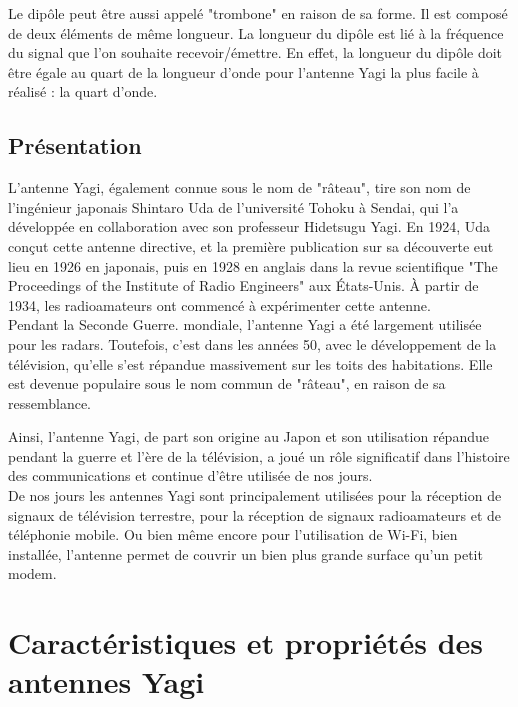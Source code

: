 \documentclass[12pt, a4paper]{article}
\begin{document}
Le dipôle peut être aussi appelé "trombone" en raison de sa
forme. Il est composé de deux éléments de même longueur. 
La longueur du dipôle est lié à la fréquence du signal
que l'on souhaite recevoir/émettre. En effet, la longueur
du dipôle doit être égale au quart de la longueur d'onde 
pour l'antenne Yagi la plus facile à réalisé : la quart d'onde.



\subsection{Présentation}

L'antenne Yagi, également connue sous le nom de 
"râteau", tire son nom de l'ingénieur japonais 
Shintaro Uda de l'université Tohoku à Sendai, qui 
l'a développée en collaboration avec son professeur 
Hidetsugu Yagi. En 1924, Uda conçut cette antenne 
directive, et la première publication sur sa découverte 
eut lieu en 1926 en japonais, puis en 1928 en anglais 
dans la revue scientifique "The Proceedings of the 
Institute of Radio Engineers" aux États-Unis. 
À partir de 1934, les radioamateurs ont commencé à
expérimenter cette antenne.\\

Pendant la Seconde Guerre. mondiale, l'antenne 
Yagi a été largement utilisée pour les radars.
Toutefois, c'est dans les années 50, avec le
développement de la télévision, qu'elle s'est
répandue massivement sur les toits des habitations.
Elle est devenue populaire sous le nom
commun de "râteau", en raison de sa ressemblance.

Ainsi, l'antenne Yagi, de part son origine au Japon et
son utilisation répandue pendant la guerre et l'ère
de la télévision, a joué un rôle significatif dans
l'histoire des communications et continue d'être
utilisée de nos jours.\\

De nos jours les antennes Yagi sont principalement 
utilisées pour la réception de signaux de télévision
terrestre, pour la réception de signaux
radioamateurs et de téléphonie mobile. Ou bien même 
encore pour l'utilisation de Wi-Fi, bien installée, 
l'antenne permet de couvrir un bien plus grande surface 
qu'un petit modem. 


\section{Caractéristiques et propriétés des antennes Yagi}
\end{document}
